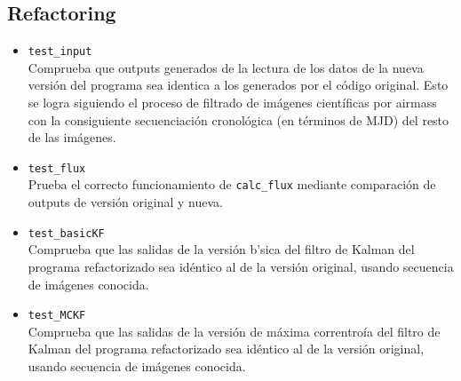 \begin{appendix}
\subsection{Refactoring}
\begin{itemize}
\item \texttt{test\_input}\\
Comprueba que outputs generados de la lectura de los datos de la nueva versi\'on del programa sea identica a los generados por el c\'odigo original. Esto se logra siguiendo el proceso de filtrado de im\'agenes cient\'ificas por airmass con la consiguiente secuenciaci\'on cronol\'ogica (en t\'erminos de MJD) del resto de las im\'agenes.
\item \texttt{test\_flux}\\
Prueba el correcto funcionamiento de \texttt{calc\_flux} mediante comparaci\'on de outputs de versi\'on original y nueva.
\item \texttt{test\_basicKF}\\
Comprueba que las salidas de la versi\'on b\a'sica del filtro de Kalman del programa refactorizado sea id\'entico al de la versi\'on original, usando secuencia de im\'agenes conocida.
\item \texttt{test\_MCKF}\\
Comprueba que las salidas de la versi\'on de m\'axima correntro\'ia  del filtro de Kalman del programa refactorizado sea id\'entico al de la versi\'on original, usando secuencia de im\'agenes conocida.
\end{itemize}
\end{appendix}

